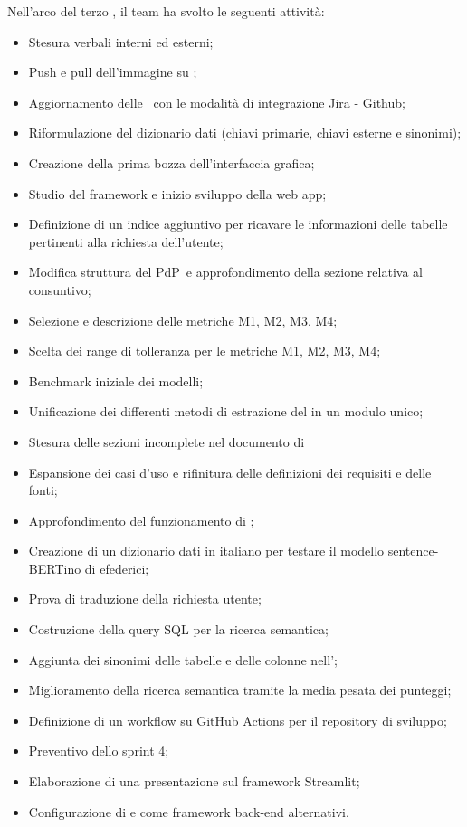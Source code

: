 Nell'arco del terzo , il team ha svolto le seguenti attività:
\begin{itemize}
    \item Stesura verbali interni ed esterni;
    \item Push e pull dell'immagine  su ;
    \item Aggiornamento delle \NdP\ con le modalità di integrazione Jira - Github;
    \item Riformulazione del dizionario dati (chiavi primarie, chiavi esterne e sinonimi);
    \item Creazione della prima bozza dell'interfaccia grafica;
    \item Studio del framework  e inizio sviluppo della web app;
    \item Definizione di un indice aggiuntivo per ricavare le informazioni delle tabelle pertinenti alla richiesta dell'utente;	
    \item Modifica struttura del PdP\ e approfondimento della sezione relativa al consuntivo;
    \item Selezione e descrizione delle metriche M1, M2, M3, M4;
    \item Scelta dei range di tolleranza per le metriche M1, M2, M3, M4;
    \item Benchmark iniziale dei modelli;
    \item Unificazione dei differenti metodi di estrazione del  in un modulo unico;
    \item Stesura delle sezioni incomplete nel documento di \AdR\;
    \item Espansione dei casi d'uso e rifinitura delle definizioni dei requisiti e delle fonti;
    \item Approfondimento del funzionamento di ;
    \item Creazione di un dizionario dati in italiano per testare il modello sentence-BERTino di efederici;
    \item Prova di traduzione della richiesta utente;
    \item Costruzione della query SQL per la ricerca semantica;
    \item Aggiunta dei sinonimi delle tabelle e delle colonne nell';
    \item Miglioramento della ricerca semantica tramite la media pesata dei punteggi;
    \item Definizione di un workflow su GitHub Actions per il repository di sviluppo;
    \item Preventivo dello sprint 4;
    \item Elaborazione di una presentazione sul framework Streamlit;
    \item Configurazione di  e  come framework back-end alternativi.
\end{itemize}


